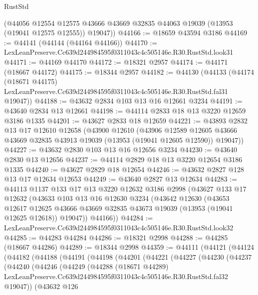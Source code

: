 \begin{lexlean}{RustStd}
\begin{coremodule}
      (@44056
        @12554
        @12575
        @43666
        @43669
        @32835
        @44063
        @19039
        (@13953 (@19041 @12575 @12555))
        @19047))
@44166 := @18659 @43594 @3186
@44169 := @44141 (@44144 (@44164 @44166))
@44170 := LexLeanPreserve.Cc639d244984595f0311043c4c505146e.R30.RustStd.look31
@44171 := @44169 @44170
@44172 := @18321 @2957
@44174 := @44171 (@18667 @44172)
@44175 := @18344 @2957
@44182 := @44130
    (@44133
      (@44174
        (@18671 @44175)
        LexLeanPreserve.Cc639d244984595f0311043c4c505146e.R30.RustStd.fal31
        @19047))
@44188 := @43632 @2834 @103 @13 @16 @12661 @3234
@44191 := @43640 @2834 @13 @12661
@44198 := @44114 @2833 @18 @13 @3220 @12659 @3186 @1335
@44201 := @43627 @2833 @18 @12659
@44221 := @43893
    @2832
    @13
    @17
    @12610
    @12658
    (@43900
      @12610
      (@43906
        @12589
        @12605
        @43666
        @43669
        @32835
        @43913
        @19039
        (@13953 (@19041 @12605 @12590))
        @19047))
@44227 := @43632 @2830 @103 @13 @16 @12656 @3234
@44230 := @43640 @2830 @13 @12656
@44237 := @44114 @2829 @18 @13 @3220 @12654 @3186 @1335
@44240 := @43627 @2829 @18 @12654
@44246 := @43632 @2827 @128 @13 @17 @12634 @12653
@44249 := @43640 @2827 @13 @12634
@44283 := @44113
    @1137
    @133
    @17
    @13
    @3220
    @12632
    @3186
    @2998
    (@43627
      @133
      @17
      @12632
      (@43633
        @103
        @13
        @16
        @12630
        @3234
        (@43642
          @12630
          (@43653
            @12617
            @12625
            @43666
            @43669
            @32835
            @43673
            @19039
            (@13953 (@19041 @12625 @12618))
            @19047))
        @44166))
@44284 := LexLeanPreserve.Cc639d244984595f0311043c4c505146e.R30.RustStd.look32
@44285 := @44283 @44284
@44286 := @18321 @2998
@44288 := @44285 (@18667 @44286)
@44289 := @18344 @2998
@44359 := @44111
    (@44121
      (@44124
        (@44182
          (@44188
            (@44191
              (@44198
                (@44201
                  (@44221
                    (@44227
                      (@44230
                        (@44237
                          (@44240
                            (@44246
                              (@44249
                                (@44288
                                  (@18671 @44289)
                                  LexLeanPreserve.Cc639d244984595f0311043c4c505146e.R30.RustStd.fal32
                                  @19047))
                              (@43632
                                @126

\end{coremodule}
\end{lexlean}
